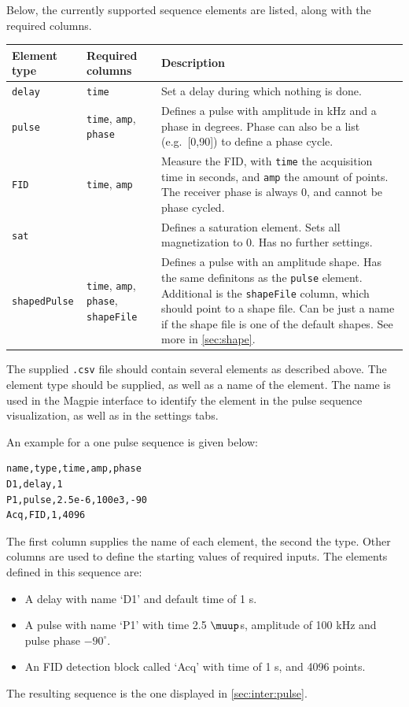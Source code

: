 \documentclass[11pt,a4paper]{article}
\begin{document}
Below, the currently supported sequence elements are listed, along with the required columns.

\begin{center}
\begin{tabular}{lp{3.5cm}p{7.5cm}}
\toprule
Element type & Required columns & Description \\
\midrule
\rowcolor{gray!30!white}
\texttt{delay} & \texttt{time} & Set a delay during which nothing is done.\\
\texttt{pulse} & \texttt{time}, \texttt{amp}, \texttt{phase} & Defines a pulse with amplitude in kHz and a phase in degrees. Phase can also be a list (e.g.\ [0,90]) to define a phase cycle.\\
\rowcolor{gray!30!white}
\texttt{FID} & \texttt{time}, \texttt{amp} & Measure the FID, with \texttt{time} the acquisition time in seconds, and \texttt{amp} the amount of points. The receiver phase is always 0, and cannot be phase cycled.\\
\texttt{sat} & & Defines a saturation element. Sets all magnetization to 0. Has no further settings.\\
\rowcolor{gray!30!white}
\texttt{shapedPulse} & \texttt{time}, \texttt{amp}, \texttt{phase}, \texttt{shapeFile} & Defines a pulse with an amplitude shape. Has the same definitons as the \texttt{pulse} element. Additional is the \texttt{shapeFile} column, which should point to a shape file. Can be just a name if the shape file is one of the default shapes. See more in \autoref{sec:shape}.\\
\bottomrule
\end{tabular}
\end{center}

The supplied \texttt{.csv} file should contain several elements as described above. The element type should be supplied, as well as a name of the element. The name is used in the Magpie interface to identify the element in the pulse sequence visualization, as well as in the settings tabs.

An example for a one pulse sequence is given below:

\begin{verbatim}
name,type,time,amp,phase
D1,delay,1
P1,pulse,2.5e-6,100e3,-90
Acq,FID,1,4096
\end{verbatim}
The first column supplies the name of each element, the second the type. Other columns are used to define the starting values of required inputs. The elements defined in this sequence are:
\begin{itemize}
\item A delay with name `D1' and default time of 1 s.
\item A pulse with name `P1' with time 2.5 $\muup$s, amplitude of 100 kHz and pulse phase $-90^\circ$.
\item An FID detection block called `Acq' with time of 1 s, and 4096 points.
\end{itemize}
The resulting sequence is the one displayed in \autoref{sec:inter:pulse}.
\end{document}

